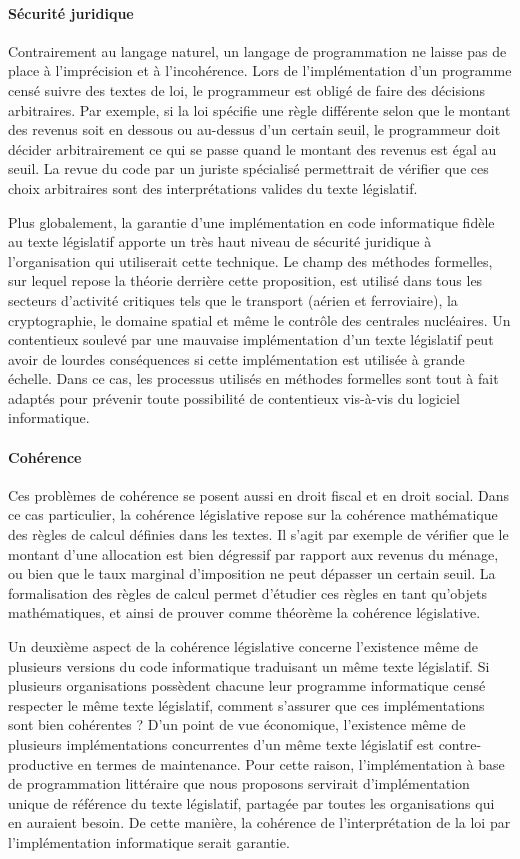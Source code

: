 \documentclass[12pt, french]{article}
\begin{document}
\paragraph{Sécurité juridique} Contrairement au langage naturel, un langage de programmation ne laisse pas de place à l'imprécision et à l'incohérence. Lors de l'implémentation d'un programme censé suivre des textes de loi, le programmeur est obligé de faire des décisions arbitraires. Par exemple, si la loi spécifie une règle différente selon que le montant des revenus soit en dessous ou au-dessus d'un certain seuil, le programmeur doit décider arbitrairement ce qui se passe quand le montant des revenus est égal au seuil. La revue du code par un juriste spécialisé permettrait de vérifier que ces choix arbitraires sont des interprétations valides du texte législatif.

Plus globalement, la garantie d'une implémentation en code informatique fidèle au texte législatif apporte un très haut niveau de sécurité juridique à l'organisation qui utiliserait cette technique. Le champ des méthodes formelles, sur lequel repose la théorie derrière cette proposition, est utilisé dans tous les secteurs d'activité critiques tels que le transport (aérien et ferroviaire), la cryptographie, le domaine spatial et même le contrôle des centrales nucléaires. Un contentieux soulevé par une mauvaise implémentation d'un texte législatif peut avoir de lourdes conséquences si cette implémentation est utilisée à grande échelle. Dans ce cas, les processus utilisés en méthodes formelles sont tout à fait adaptés pour prévenir toute possibilité de contentieux vis-à-vis du logiciel informatique.

\paragraph{Cohérence} Ces problèmes de cohérence se posent aussi en droit fiscal et en droit social. Dans ce cas particulier, la cohérence législative repose sur la cohérence mathématique des règles de calcul définies dans les textes. Il s'agit par exemple de vérifier que le montant d'une allocation est bien dégressif par rapport aux revenus du ménage, ou bien que le taux marginal d'imposition ne peut dépasser un certain seuil. La formalisation des règles de calcul permet d'étudier ces règles en tant qu'objets mathématiques, et ainsi de prouver comme théorème la cohérence législative.

Un deuxième aspect de la cohérence législative concerne l'existence même de plusieurs versions du code informatique traduisant un même texte législatif. Si plusieurs organisations possèdent chacune leur programme informatique censé respecter le même texte législatif, comment s'assurer que ces implémentations sont bien cohérentes ? D'un point de vue économique, l'existence même de plusieurs implémentations concurrentes d'un même texte législatif est contre-productive en termes de maintenance. Pour cette raison, l'implémentation à base de programmation littéraire que nous proposons servirait d'implémentation unique de référence du texte législatif, partagée par toutes les organisations qui en auraient besoin. De cette manière, la cohérence de l'interprétation de la loi par l'implémentation informatique serait garantie.
\end{document}
